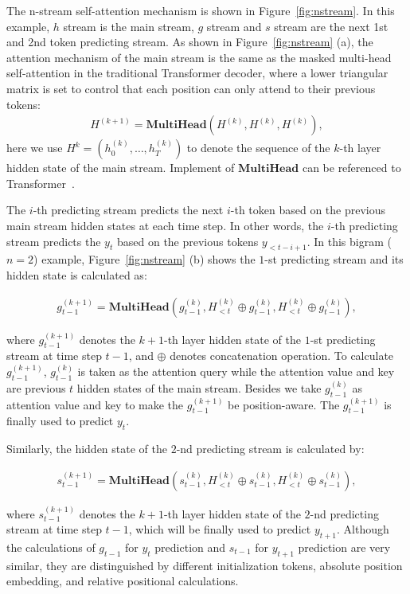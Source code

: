 \documentclass[11pt,a4paper]{article}
\begin{document}
The n-stream self-attention mechanism is shown in Figure~\ref{fig:nstream}. In this example, $h$ stream is the main stream, $g$ stream and $s$ stream are the next 1st and 2nd token predicting stream. As shown in Figure~\ref{fig:nstream} (a), the attention mechanism of the main stream is the same as the masked multi-head self-attention in the traditional Transformer decoder, where a lower triangular matrix is set to control that each position can only attend to their previous tokens:
\begin{align}
    H^{(k+1)} = \textbf{MultiHead}(H^{(k)}, H^{(k)}, H^{(k)}),
\end{align}
here we use $H^{k}= (h^{(k)}_0, \dots, h^{(k)}_T)$ to denote the sequence of the $k$-th layer hidden state of the main stream. Implement of $\textbf{MultiHead}$ can be referenced to  Transformer~\cite{vaswani2017attention}.

The $i$-th predicting stream predicts the next $i$-th token based on the previous main stream hidden states at each time step.
In other words, the $i$-th predicting stream predicts the $y_t$ based on the previous tokens $y_{<t-i+1}$.  
In this  bigram ($n=2$) example, Figure~\ref{fig:nstream} (b) shows the  $1$-st predicting stream and its hidden state is calculated as:

\begin{small}
\begin{align}
g^{(k+1)}_{t-1} = \textbf{MultiHead}(g^{(k)}_{t-1}, H^{(k)}_{<t} \oplus g^{(k)}_{t-1}, H^{(k)}_{<t}\oplus g^{(k)}_{t-1}),
\end{align}
\end{small}
where $g^{(k+1)}_{t-1}$ denotes the $k+1$-th layer hidden state of the $1$-st predicting stream at time step $t-1$, and $\oplus$ denotes concatenation operation. To calculate $g^{(k+1)}_{t-1}$, $g^{(k)}_{t-1}$ is taken as the attention query while the attention value and key are previous $t$ hidden states of the main stream. Besides we take $g^{(k)}_{t-1}$ as attention value and key to make the $g^{(k+1)}_{t-1}$ be position-aware. The $g^{(k+1)}_{t-1}$ is finally used to predict $y_{t}$.

Similarly, the hidden state of the $2$-nd predicting stream is calculated by:

\begin{small}
\begin{align}
    s^{(k+1)}_{t-1}= \textbf{MultiHead}(s^{(k)}_{t-1}, H^{(k)}_{<t} \oplus s^{(k)}_{t-1}, H^{(k)}_{<t}\oplus s^{(k)}_{t-1}),
\end{align}
\end{small}
where $s^{(k+1)}_{t-1}$ denotes the $k+1$-th layer hidden state of the $2$-nd predicting stream at time step $t-1$, which will be finally used to predict $y_{t+1}$.
Although the calculations of $g_{t-1}$ for $y_{t}$ prediction and $s_{t-1}$ for $y_{t+1}$ prediction are very similar, they are distinguished by different initialization tokens, absolute position embedding, and relative positional calculations.
\end{document}
